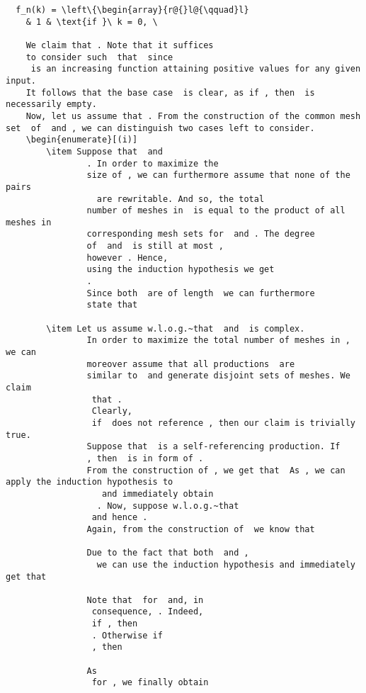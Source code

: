 \documentclass[11pt,a4paper]{amsart}
\theoremstyle{definition}
\begin{document}
\begin{lstlisting}
  f_n(k) = \left\{\begin{array}{r@{}l@{\qquad}l}
    & 1 & \text{if }\ k = 0, \

    We claim that . Note that it suffices
    to consider such  that  since
     is an increasing function attaining positive values for any given input.
	It follows that the base case  is clear, as if , then  is necessarily empty.
	Now, let us assume that . From the construction of the common mesh set  of  and , we can distinguish two cases left to consider.
    \begin{enumerate}[(i)]
        \item Suppose that  and
                . In order to maximize the
                size of , we can furthermore assume that none of the pairs
                  are rewritable. And so, the total
                number of meshes in  is equal to the product of all meshes in
                corresponding mesh sets for  and . The degree
                of  and  is still at most ,
                however . Hence,
                using the induction hypothesis we get
                .
                Since both  are of length  we can furthermore
                state that
                
        \item Let us assume w.l.o.g.~that  and  is complex.
                In order to maximize the total number of meshes in , we can
                moreover assume that all productions  are
                similar to  and generate disjoint sets of meshes. We claim
                 that . 
                 Clearly,
                 if  does not reference , then our claim is trivially true.
                Suppose that  is a self-referencing production. If 
                , then  is in form of .
                From the construction of , we get that  As , we can apply the induction hypothesis to 
                   and immediately obtain 
                  . Now, suppose w.l.o.g.~that
                 and hence .
                Again, from the construction of  we know that
                
                Due to the fact that both  and ,
                  we can use the induction hypothesis and immediately get that
                
                Note that  for  and, in
                 consequence, . Indeed, 
                 if , then
                 . Otherwise if 
                 , then
                
                As
                 for , we finally obtain
				                

\end{lstlisting}
\end{document}
